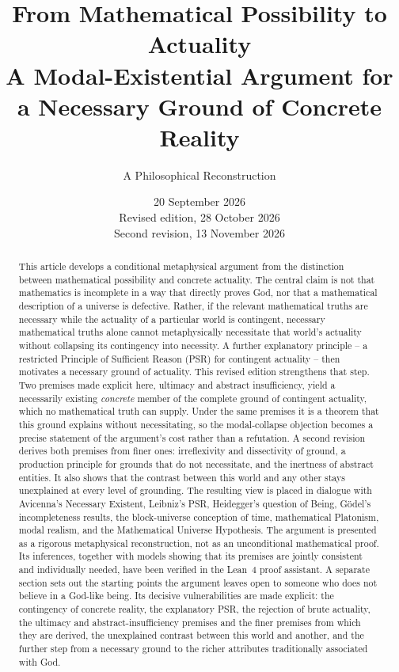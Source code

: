 \documentclass[11pt,letterpaper]{article}
\title{\textbf{From Mathematical Possibility to Actuality}\\[0.5em]
  \large A Modal-Existential Argument for a Necessary Ground of Concrete Reality}
\author{A Philosophical Reconstruction}
\date{20 September 2026\\[0.3em]\normalsize Revised edition, 28 October 2026\\Second revision, 13 November 2026}
\theoremstyle{plain}
\theoremstyle{definition}
\begin{document}
\maketitle

\begin{abstract}
This article develops a conditional metaphysical argument from the distinction between mathematical possibility and concrete actuality. The central claim is not that mathematics is incomplete in a way that directly proves God, nor that a mathematical description of a universe is defective. Rather, if the relevant mathematical truths are necessary while the actuality of a particular world is contingent, necessary mathematical truths alone cannot metaphysically necessitate that world's actuality without collapsing its contingency into necessity. A further explanatory principle -- a restricted Principle of Sufficient Reason (PSR) for contingent actuality -- then motivates a necessary ground of actuality. This revised edition strengthens that step. Two premises made explicit here, ultimacy and abstract insufficiency, yield a necessarily existing \emph{concrete} member of the complete ground of contingent actuality, which no mathematical truth can supply. Under the same premises it is a theorem that this ground explains without necessitating, so the modal-collapse objection becomes a precise statement of the argument's cost rather than a refutation. A second revision derives both premises from finer ones: irreflexivity and dissectivity of ground, a production principle for grounds that do not necessitate, and the inertness of abstract entities. It also shows that the contrast between this world and any other stays unexplained at every level of grounding. The resulting view is placed in dialogue with Avicenna's Necessary Existent, Leibniz's PSR, Heidegger's question of Being, Gödel's incompleteness results, the block-universe conception of time, mathematical Platonism, modal realism, and the Mathematical Universe Hypothesis. The argument is presented as a rigorous metaphysical reconstruction, not as an unconditional mathematical proof. Its inferences, together with models showing that its premises are jointly consistent and individually needed, have been verified in the Lean~4 proof assistant. A separate section sets out the starting points the argument leaves open to someone who does not believe in a God-like being. Its decisive vulnerabilities are made explicit: the contingency of concrete reality, the explanatory PSR, the rejection of brute actuality, the ultimacy and abstract-insufficiency premises and the finer premises from which they are derived, the unexplained contrast between this world and another, and the further step from a necessary ground to the richer attributes traditionally associated with God.
\end{abstract}
\end{document}

